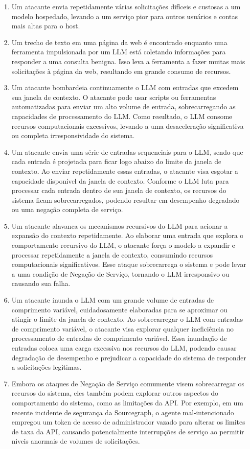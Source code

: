 \documentclass[
]{article}
\providecommand{\tightlist}{%
  \setlength{\itemsep}{0pt}\setlength{\parskip}{0pt}}
\begin{document}
\begin{enumerate}
\def\labelenumi{\arabic{enumi}.}
\tightlist
\item
  Um atacante envia repetidamente várias solicitações difíceis e
  custosas a um modelo hospedado, levando a um serviço pior para outros
  usuários e contas mais altas para o host.
\item
  Um trecho de texto em uma página da web é encontrado enquanto uma
  ferramenta impulsionada por um LLM está coletando informações para
  responder a uma consulta benigna. Isso leva a ferramenta a fazer
  muitas mais solicitações à página da web, resultando em grande consumo
  de recursos.
\item
  Um atacante bombardeia continuamente o LLM com entradas que excedem
  sua janela de contexto. O atacante pode usar scripts ou ferramentas
  automatizadas para enviar um alto volume de entrada, sobrecarregando
  as capacidades de processamento do LLM. Como resultado, o LLM consome
  recursos computacionais excessivos, levando a uma desaceleração
  significativa ou completa irresponsividade do sistema.
\item
  Um atacante envia uma série de entradas sequenciais para o LLM, sendo
  que cada entrada é projetada para ficar logo abaixo do limite da
  janela de contexto. Ao enviar repetidamente essas entradas, o atacante
  visa esgotar a capacidade disponível da janela de contexto. Conforme o
  LLM luta para processar cada entrada dentro de sua janela de contexto,
  os recursos do sistema ficam sobrecarregados, podendo resultar em
  desempenho degradado ou uma negação completa de serviço.
\item
  Um atacante alavanca os mecanismos recursivos do LLM para acionar a
  expansão do contexto repetidamente. Ao elaborar uma entrada que
  explora o comportamento recursivo do LLM, o atacante força o modelo a
  expandir e processar repetidamente a janela de contexto, consumindo
  recursos computacionais significativos. Esse ataque sobrecarrega o
  sistema e pode levar a uma condição de Negação de Serviço, tornando o
  LLM irresponsivo ou causando sua falha.
\item
  Um atacante inunda o LLM com um grande volume de entradas de
  comprimento variável, cuidadosamente elaboradas para se aproximar ou
  atingir o limite da janela de contexto. Ao sobrecarregar o LLM com
  entradas de comprimento variável, o atacante visa explorar qualquer
  ineficiência no processamento de entradas de comprimento variável.
  Essa inundação de entradas coloca uma carga excessiva nos recursos do
  LLM, podendo causar degradação de desempenho e prejudicar a capacidade
  do sistema de responder a solicitações legítimas.
\item
  Embora os ataques de Negação de Serviço comumente visem sobrecarregar
  os recursos do sistema, eles também podem explorar outros aspectos do
  comportamento do sistema, como as limitações da API. Por exemplo, em
  um recente incidente de segurança da Sourcegraph, o agente
  mal-intencionado empregou um token de acesso de administrador vazado
  para alterar os limites de taxa da API, causando potencialmente
  interrupções de serviço ao permitir níveis anormais de volumes de
  solicitações.
\end{enumerate}
\end{document}
